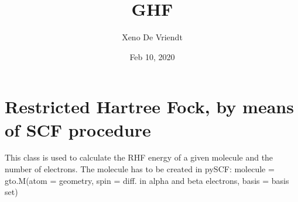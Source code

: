 \documentclass[letterpaper,10pt,english]{sphinxmanual}
\title{GHF}
\date{Feb 10, 2020}
\author{Xeno De Vriendt}
\begin{document}
\pagestyle{empty}
\sphinxmaketitle
\pagestyle{plain}
\sphinxtableofcontents
\pagestyle{normal}
\label{\detokenize{index::doc}}

\label{\detokenize{RHF:module-ghf.RHF}}

\chapter{Restricted Hartree Fock, by means of SCF procedure}
\label{\detokenize{RHF:restricted-hartree-fock-by-means-of-scf-procedure}}\label{\detokenize{RHF::doc}}
This class is used to calculate the RHF energy of a given molecule and the number of electrons.
The molecule has to be created in pySCF:
molecule = gto.M(atom = geometry, spin = diff. in alpha and beta electrons, basis = basis set)
\end{document}
